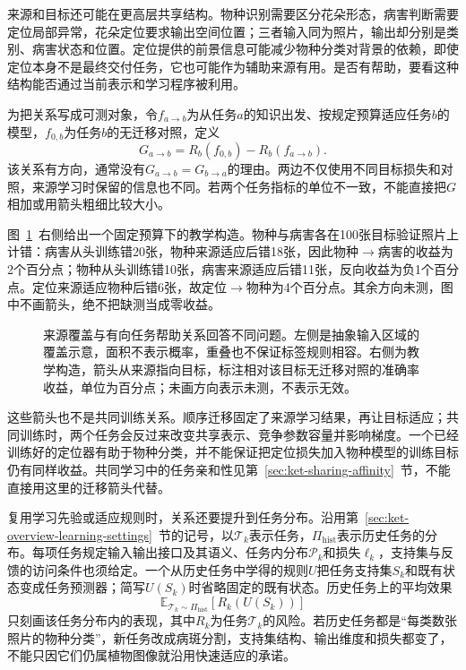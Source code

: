 来源和目标还可能在更高层共享结构。物种识别需要区分花朵形态，病害判断需要定位局部异常，花朵定位要求输出空间位置；三者输入同为照片，输出却分别是类别、病害状态和位置。定位提供的前景信息可能减少物种分类对背景的依赖，即使定位本身不是最终交付任务，它也可能作为辅助来源有用。是否有帮助，要看这种结构能否通过当前表示和学习程序被利用。

为把关系写成可测对象，令$f_{a\to b}$为从任务$a$的知识出发、按规定预算适应任务$b$的模型，$f_{0,b}$为任务$b$的无迁移对照，定义
\begin{equation}
  G_{a\to b}=R_b(f_{0,b})-R_b(f_{a\to b}).
  \label{eq:ket-reuse-directed-gain}
\end{equation}
该关系有方向，通常没有$G_{a\to b}=G_{b\to a}$的理由。两边不仅使用不同目标损失和对照，来源学习时保留的信息也不同。若两个任务指标的单位不一致，不能直接把$G$相加或用箭头粗细比较大小。

图~\ref{fig:ket-reuse-coverage-relations}~右侧给出一个固定预算下的教学构造。物种与病害各在100张目标验证照片上计错：病害从头训练错20张，物种来源适应后错18张，因此物种$\to$病害的收益为2个百分点；物种从头训练错10张，病害来源适应后错11张，反向收益为负1个百分点。定位来源适应物种后错6张，故定位$\to$物种为4个百分点。其余方向未测，图中不画箭头，绝不把缺测当成零收益。

\begin{figure}[htbp]
  \centering
  
  \caption{来源覆盖与有向任务帮助关系回答不同问题。左侧是抽象输入区域的覆盖示意，面积不表示概率，重叠也不保证标签规则相容。右侧为教学构造，箭头从来源指向目标，标注相对该目标无迁移对照的准确率收益，单位为百分点；未画方向表示未测，不表示无效。}
  \label{fig:ket-reuse-coverage-relations}
\end{figure}

这些箭头也不是共同训练关系。顺序迁移固定了来源学习结果，再让目标适应；共同训练时，两个任务会反过来改变共享表示、竞争参数容量并影响梯度。一个已经训练好的定位器有助于物种分类，并不能保证把定位损失加入物种模型的训练目标仍有同样收益。共同学习中的任务亲和性见第~\ref{sec:ket-sharing-affinity}~节，不能直接用这里的迁移箭头代替。

复用学习先验或适应规则时，关系还要提升到任务分布。沿用第~\ref{sec:ket-overview-learning-settings}~节的记号，以$\mathcal T_k$表示任务，$\Pi_{\mathrm{hist}}$表示历史任务的分布。每项任务规定输入输出接口及其语义、任务内分布$\mathcal P_k$和损失$\ell_k$，支持集与反馈的访问条件也须给定。一个从历史任务中学得的规则$U$把任务支持集$S_k$和既有状态变成任务预测器；简写$U(S_k)$时省略固定的既有状态。历史任务上的平均效果
\[
  \mathbb E_{\mathcal T_k\sim\Pi_{\mathrm{hist}}}
  [R_k(U(S_k))]
\]
只刻画该任务分布内的表现，其中$R_k$为任务$\mathcal T_k$的风险。若历史任务都是“每类数张照片的物种分类”，新任务改成病斑分割，支持集结构、输出维度和损失都变了，不能只因它们仍属植物图像就沿用快速适应的承诺。

